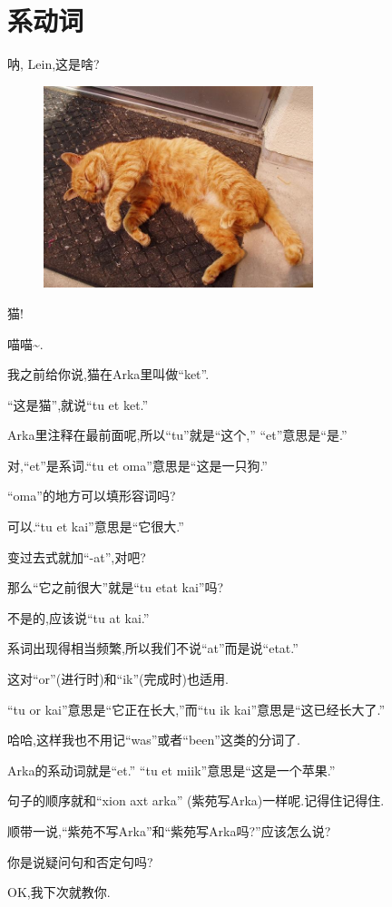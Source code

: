 \chapter[系动词]{系动词}

  

呐, Lein,这是啥?

\begin{figure}[H]
\includegraphics[width=0.7\textwidth]{ARKA/ket.jpg}
\end{figure}

猫!

喵喵\~{}.

我之前给你说,猫在Arka里叫做``ket''.

``这是猫'',就说``tu et ket.''


Arka里注释在最前面呢,所以``tu''就是``这个,'' ``et''意思是``是.''


对,``et''是系词.``tu et oma''意思是``这是一只狗.''


``oma''的地方可以填形容词吗?


可以.``tu et kai''意思是``它很大.''


变过去式就加``-at'',对吧?

那么``它之前很大''就是``tu etat kai''吗?


不是的,应该说``tu at kai.''

系词出现得相当频繁,所以我们不说``at''而是说``etat.''

这对``or''(进行时)和``ik''(完成时)也适用.

``tu or kai''意思是``它正在长大,''而``tu ik kai''意思是``这已经长大了.''


哈哈,这样我也不用记``was''或者``been''这类的分词了.

Arka的系动词就是``et.'' ``tu et miik''意思是``这是一个苹果.''

句子的顺序就和``xion axt arka'' (紫苑写Arka)一样呢.记得住记得住.

顺带一说,``紫苑不写Arka''和``紫苑写Arka吗?''应该怎么说?


你是说疑问句和否定句吗?

OK,我下次就教你.






